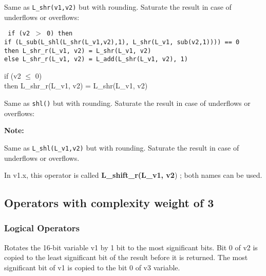 Same as {\tt L\_shr(v1,v2)} but with rounding.
Saturate the result in case of underflows or overflows:

{\tt
{} if (v2 $>$ 0) then\\
 if (L\_sub(L\_shl(L\_shr(L\_v1,v2),1), L\_shr(L\_v1, sub(v2,1)))) == 0 \\
 then L\_shr\_r(L\_v1, v2) = L\_shr(L\_v1, v2)\\
 else L\_shr\_r(L\_v1, v2) = L\_add(L\_shr(L\_v1, v2), 1)

 if (v2 $\leq$ 0) \\
 then L\_shr\_r(L\_v1, v2) = L\_shr(L\_v1, v2)}


Same as {\tt shl()} but with rounding.
Saturate the result in case of underflows or overflows:


\textbf{Note:} \hfill {}


Same as {\tt L\_shl(L\_v1,v2)} but with rounding.
Saturate the result in case of underflows or overflows.


In v1.x, this operator is called \textbf{L\_shift\_r(L\_v1, v2}) ; both names can be used.


\subsection{Operators with complexity weight of 3}

\subsubsection{Logical Operators}

 

Rotates the 16-bit variable v1 by 1 bit to the most significant bits.
Bit 0 of v2 is copied to the least significant bit of the result before it is returned.
The most significant bit of v1 is copied to the bit 0 of v3 variable.


